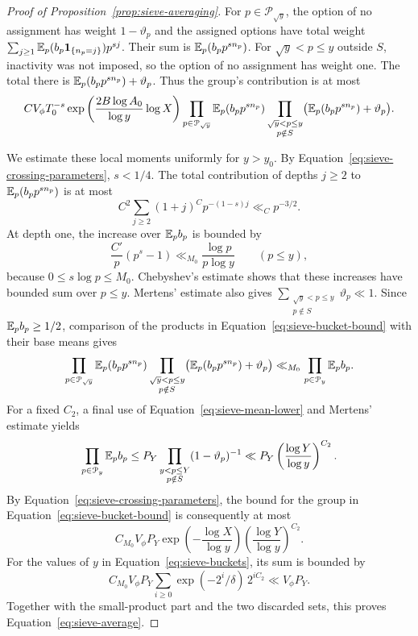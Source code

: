 \begin{proof}[Proof of Proposition~\ref{prop:sieve-averaging}]
For $p\in\mathcal P_{\sqrt y}$, the option of no assignment has weight
$1-\vartheta_p$ and the assigned options have total weight
$\sum_{j\ge1}\mathbb E_p(b_p\mathbf 1_{\{n_p=j\}})p^{sj}$.  Their sum is
$\mathbb E_p(b_p p^{s n_p})$.  For $\sqrt y<p\le y$ outside $S$, inactivity was
not imposed, so the option of no assignment has weight one.  The total
there is $\mathbb E_p(b_p p^{s n_p})+\vartheta_p$.  Thus the group's contribution
is at most
\begin{equation}\label{eq:sieve-bucket-bound}
 C V_\phi T_0^{-s}
 \exp\left(\frac{2B\log A_0}{\log y}\log X\right)
 \prod_{p\in\mathcal P_{\sqrt y}}\mathbb E_p(b_p p^{s n_p})
 \prod_{\substack{\sqrt y<p\le y\\p\notin S}}
       \bigl(\mathbb E_p(b_p p^{s n_p})+\vartheta_p\bigr).
\end{equation}

We estimate these local moments uniformly for $y>y_0$.  By
Equation~\eqref{eq:sieve-crossing-parameters}, $s<1/4$.  The total
contribution of depths $j\ge2$ to $\mathbb E_p(b_p p^{s n_p})$ is at most
\[
 C^2\sum_{j\ge2}(1+j)^C p^{-(1-s)j}\ll_C p^{-3/2}.
\]
At depth one, the increase over $\mathbb E_p b_p$ is bounded by
\[
 \frac{C'}p(p^s-1)
   \ll_{M_0}\frac{\log p}{p\log y}
 \qquad(p\le y),
\]
because $0\le s\log p\le M_0$.  Chebyshev's estimate shows that these
increases have bounded sum over $p\le y$.  Mertens' estimate also gives
$\sum_{\substack{\sqrt y<p\le y\\p\notin S}}\vartheta_p\ll1$.  Since
$\mathbb E_p b_p\ge1/2$, comparison of the products in
Equation~\eqref{eq:sieve-bucket-bound} with their base means gives
\[
 \prod_{p\in\mathcal P_{\sqrt y}}\mathbb E_p(b_p p^{s n_p})
 \prod_{\substack{\sqrt y<p\le y\\p\notin S}}
       \bigl(\mathbb E_p(b_p p^{s n_p})+\vartheta_p\bigr)
 \ll_{M_0}\prod_{p\in\mathcal P_y}\mathbb E_p b_p.
\]
For a fixed $C_2$, a final use of
Equation~\eqref{eq:sieve-mean-lower} and Mertens' estimate yields
\[
 \prod_{p\in\mathcal P_y}\mathbb E_p b_p
 \le P_Y\prod_{\substack{y<p\le Y\\p\notin S}}
                 (1-\vartheta_p)^{-1}
 \ll P_Y\left(\frac{\log Y}{\log y}\right)^{C_2}.
\]
By Equation~\eqref{eq:sieve-crossing-parameters}, the bound for the group
in Equation~\eqref{eq:sieve-bucket-bound} is consequently at most
\[
 C_{M_0}V_\phi P_Y
 \exp\left(-\frac{\log X}{\log y}\right)
 \left(\frac{\log Y}{\log y}\right)^{C_2}.
\]
For the values of $y$ in Equation~\eqref{eq:sieve-buckets}, its sum is
bounded by
\[
 C_{M_0}V_\phi P_Y
       \sum_{i\ge0}\exp(-2^i/\delta)\,2^{iC_2}
 \ll V_\phi P_Y.
\]
Together with the small-product part and the two discarded sets, this
proves Equation~\eqref{eq:sieve-average}.
\end{proof}

